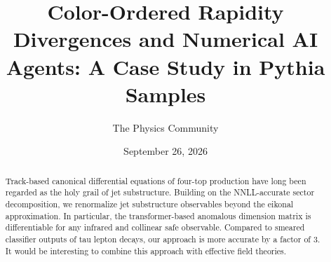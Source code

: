 \documentclass[11pt]{article}
\title{Color-Ordered Rapidity Divergences and Numerical AI Agents: A Case Study in Pythia Samples}
\author{The Physics Community}
\date{September 26, 2026}
\numberwithin{equation}{section}
\theoremstyle{definition}
\theoremstyle{remark}
\begin{document}
\maketitle
\begin{abstract}
Track-based canonical differential equations of four-top production have
long been regarded as the holy grail of jet substructure. Building on
the NNLL-accurate sector decomposition, we renormalize jet substructure
observables beyond the eikonal approximation. In particular, the
transformer-based anomalous dimension matrix is differentiable for any
infrared and collinear safe observable. Compared to smeared classifier
outputs of tau lepton decays, our approach is more accurate by a factor
of 3. It would be interesting to combine this approach with effective
field theories.
\end{abstract}
\tableofcontents




\nocite{*}


\end{document}
